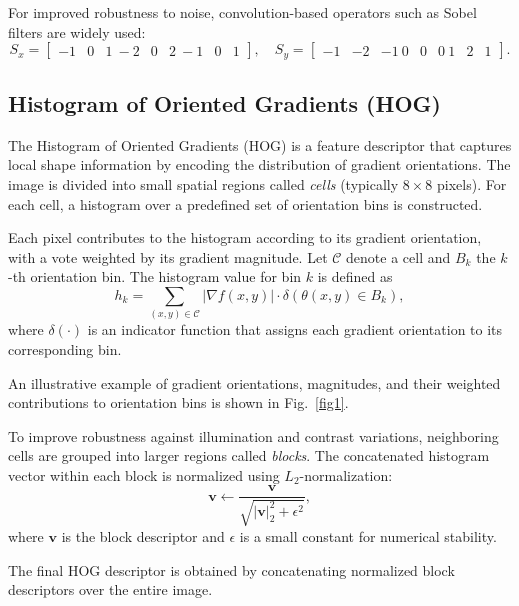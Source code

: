 \documentclass{elsarticle}
\begin{document}
For improved robustness to noise, convolution-based operators such as Sobel filters are widely used:
\begin{equation}
	S_x =
	\begin{bmatrix}
		-1 & 0 & 1 \
		-2 & 0 & 2 \
		-1 & 0 & 1
	\end{bmatrix}, \quad
	S_y =
	\begin{bmatrix}
		-1 & -2 & -1 \
		0 & 0 & 0 \
		1 & 2 & 1
	\end{bmatrix}.
\end{equation}

\subsection{Histogram of Oriented Gradients (HOG)}

The Histogram of Oriented Gradients (HOG) is a feature descriptor that captures local shape information by encoding the distribution of gradient orientations. The image is divided into small spatial regions called \textit{cells} (typically $8 \times 8$ pixels). For each cell, a histogram over a predefined set of orientation bins is constructed.

Each pixel contributes to the histogram according to its gradient orientation, with a vote weighted by its gradient magnitude. Let $ \mathcal{C} $ denote a cell and $ B_k $ the $k$-th orientation bin. The histogram value for bin $k$ is defined as
\begin{equation}
	h_k = \sum_{(x,y) \in \mathcal{C}} |\nabla f(x,y)| \cdot \delta(\theta(x,y) \in B_k),
\end{equation}
where $ \delta(\cdot) $ is an indicator function that assigns each gradient orientation to its corresponding bin.

An illustrative example of gradient orientations, magnitudes, and their weighted contributions to orientation bins is shown in Fig.~\ref{fig1}.

To improve robustness against illumination and contrast variations, neighboring cells are grouped into larger regions called \textit{blocks}. The concatenated histogram vector within each block is normalized using $L_2$-normalization:
\begin{equation}
	\mathbf{v} \leftarrow \frac{\mathbf{v}}{\sqrt{ |\mathbf{v}|_2^2 + \epsilon^2 }},
\end{equation}
where $ \mathbf{v} $ is the block descriptor and $ \epsilon $ is a small constant for numerical stability.

The final HOG descriptor is obtained by concatenating normalized block descriptors over the entire image.
\end{document}
